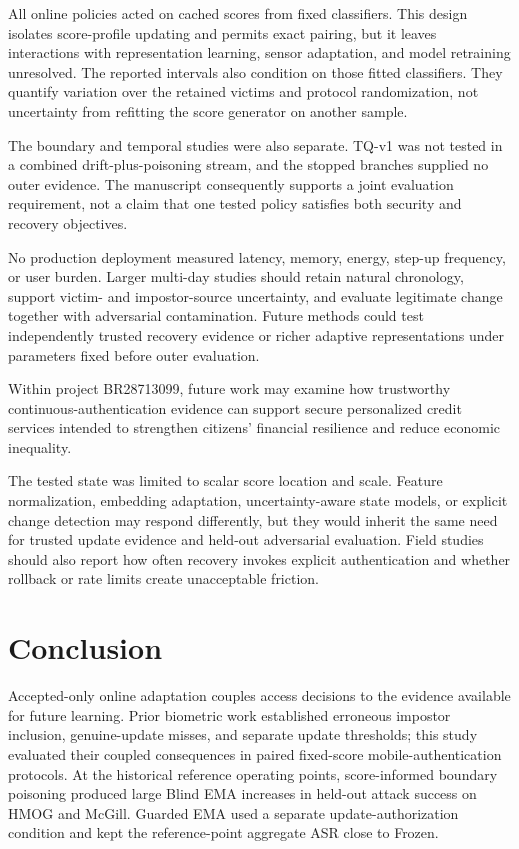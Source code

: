 \documentclass[technologies,article,submit,moreauthors]{Definitions/mdpi}
\begin{document}
All online policies acted on cached scores from fixed classifiers. This design isolates score-profile updating and permits exact pairing, but it leaves interactions with representation learning, sensor adaptation, and model retraining unresolved. The reported intervals also condition on those fitted classifiers. They quantify variation over the retained victims and protocol randomization, not uncertainty from refitting the score generator on another sample.

The boundary and temporal studies were also separate. TQ-v1 was not tested in a combined drift-plus-poisoning stream, and the stopped branches supplied no outer evidence. The manuscript consequently supports a joint evaluation requirement, not a claim that one tested policy satisfies both security and recovery objectives.

No production deployment measured latency, memory, energy, step-up frequency, or user burden. Larger multi-day studies should retain natural chronology, support victim- and impostor-source uncertainty, and evaluate legitimate change together with adversarial contamination. Future methods could test independently trusted recovery evidence or richer adaptive representations under parameters fixed before outer evaluation.

Within project BR28713099, future work may examine how trustworthy continuous-authentication evidence can support secure personalized credit services intended to strengthen citizens' financial resilience and reduce economic inequality.

The tested state was limited to scalar score location and scale. Feature normalization, embedding adaptation, uncertainty-aware state models, or explicit change detection may respond differently, but they would inherit the same need for trusted update evidence and held-out adversarial evaluation. Field studies should also report how often recovery invokes explicit authentication and whether rollback or rate limits create unacceptable friction.

\section{Conclusion}\label{sec:conclusion}

Accepted-only online adaptation couples access decisions to the evidence available for future learning. Prior biometric work established erroneous impostor inclusion, genuine-update misses, and separate update thresholds; this study evaluated their coupled consequences in paired fixed-score mobile-authentication protocols. At the historical reference operating points, score-informed boundary poisoning produced large Blind EMA increases in held-out attack success on HMOG and McGill. Guarded EMA used a separate update-authorization condition and kept the reference-point aggregate ASR close to Frozen.
\end{document}
